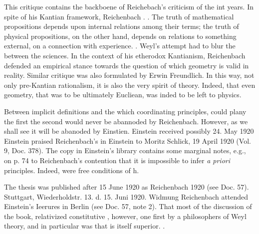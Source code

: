\documentclass[draft]{article}
\begin{document}
{This critique contains the backboene of Reichebach's criticism of the \ufp int years. In spite of his Kantian framework, Reichenbach . . The truth of mathematical propositions depends upon internal relations among their terms; the truth of physical propositions, on the other hand, depends on relations to something external, on a connection with experience. . Weyl's attempt had to blur the between the sciences. In the context of his etherodox Kantianism, Reichenbach defended an empirical stance towards the question of which geometry is valid in reality. Similar critique was also formulated by Erwin Freundlich. In this way, not only pre-Kantian rationalism, it is also the very spirit of \rt theory. Indeed, that even geometry, that was to be ultimately Eucliean, was inded to be left to physics. 


Between implicit definitions and the which coordinating principles, could plany the first the second would never be abannoded by Reichenbach. However, as we shall see it will be abanoded by Einstien. Einstein received possibly 24. May 1920 Einstein praised Reichenbach's  in Einstein to Moritz Schlick, 19 April 1920 (Vol. 9, Doc. 378). The copy in Einstein's library contains some marginal notes, e.g.,  on p. 74 to Reichenbach's contention that it is impossible to infer \textit{a priori} principles. Indeed, were free conditions of h. 

The thesis was published after 15 June 1920 as Reichenbach 1920 (see Doc. 57). Stuttgart, Wiederholdstr. 13. d. 15. Juni 1920. Widmung Reichenbach attended Einstein's Ieerures in Berlin (see Doc. 57, note 2). That most of the discussion of the book, relativized constitutive \apr, however, one first by a philosophers of Weyl theory, and in particular was that is itself superior.   . 


}
\end{document}
